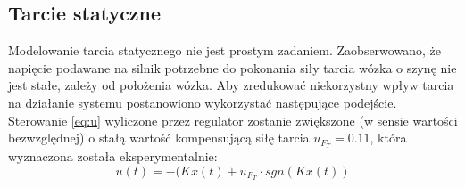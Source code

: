 \subsection{Tarcie statyczne}
Modelowanie tarcia statycznego nie jest prostym zadaniem. Zaobserwowano, że napięcie podawane na silnik potrzebne do pokonania siły tarcia wózka o szynę nie jest stałe, zależy od położenia wózka. Aby zredukować niekorzystny wpływ tarcia na działanie systemu postanowiono wykorzystać następujące podejście. Sterowanie \ref{eq:u} wyliczone przez regulator zostanie zwiększone (w sensie wartości bezwzględnej) o stałą wartość kompensującą siłę tarcia $u_{F_T}=0.11$, która wyznaczona została eksperymentalnie:
\begin{equation}
\label{eq:Kompen}
u(t) = -(Kx(t)+u_{F_T}\cdot sgn(Kx(t))
\end{equation}
